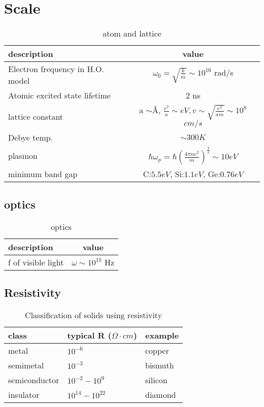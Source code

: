 \section{Scale}
\begin{table}[h]
    \centering
    \caption{atom and lattice}
    \label{tab:atom}
    \begin{tabular}{l | c}
	\hline
	description & value \\
	\hline
	Electron frequency in H.O. model    & $\omega_0 = \sqrt{\frac{k}{m}} \sim 10^{16}$ rad/s \\
	\hline
	Atomic excited state lifetime  & 2 ns\\
	\hline
	lattice constant & a $\sim\si{\angstrom}$, $\frac{e^2}{a} \sim eV, v \sim \sqrt{\frac{e^2}{am}} \sim 10^{8}$ $cm/s$  \\ 
	\hline
	Debye temp. & $\sim 300 K$  \\
	\hline
	plasmon	& $\hbar \omega_p = \hbar \left(\frac{4\pi ne^2}{m}\right)^{\frac{1}{2}} \sim 10 eV$	\\
	\hline
	minimum band gap    & C:$5.5 eV$, Si:$1.1eV$, Ge:$0.76eV$
    \end{tabular}
\end{table}

\subsection{optics}
\begin{table}[h]
    \centering
    \caption{optics}
    \label{tab:optics}
    \begin{tabular}{l | c}
	\hline
	description & value \\
	\hline
	f of visible light  & $\omega \sim 10^{15}$ Hz   \\
	\hline
    \end{tabular}
\end{table}

\subsection{Resistivity}
\begin{table}[h]
    \centering
    \caption{Classification of solids using resistivity}
    \label{tab:resistivity}
    \begin{tabular}{l  l  l}
	\hline
	class	& typical R ($\Omega \cdot cm$)	& example   \\
	\hline
	metal	    & $10^{-6}$ & copper	\\
	semimetal   & $10^{-3}$	& bismuth	\\
	semiconductor	& $10^{-2}-10^{9}$ &	silicon	\\
	insulator   & $10^{14}-10^{22}$	    & diamond	\\
	\hline
    \end{tabular}
\end{table}


